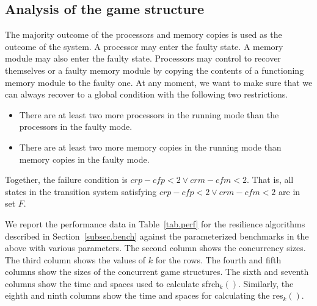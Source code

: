 \subsection*{Analysis of the game structure} 
The majority outcome of the processors and memory copies 
is used as the outcome of the system.  
A processor may enter the faulty state.  
A memory module may also enter the faulty state. 
Processors may control to recover themselves or a faulty memory module 
by copying the contents of a functioning memory module to 
the faulty one.  
At any moment, we want to make sure that we can always recover 
to a global condition with the following two restrictions. 
\begin{itemize} 
\item There are at least two more processors in \label{reply2.2more} 
	the running mode than the processors in the faulty mode.  
\item There are at least two more memory copies in 
	the running mode than memory copies in the faulty mode. 
\end{itemize} 
Together, the failure condition is 
$\textit{crp}-\textit{cfp}<2\vee\textit{crm}-\textit{cfm}<2$.  
That is, all states in the transition system satisfying 
$\textit{crp}-\textit{cfp}<2\vee\textit{crm}-\textit{cfm}<2$ 
are in set $F$.  

We report the performance data 
in Table~\ref{tab.perf} for the resilience algorithms 
described in Section~\ref{subsec.bench} 
against the parameterized benchmarks in the above with various 
parameters.  
The second column shows the concurrency sizes.  
The third column shows the values of $k$ for the rows.  
The fourth and fifth columns show the sizes of the concurrent game structures.  
The sixth and seventh columns show the time and spaces used to calculate 
sfrch$_k()$.  
Similarly, the eighth and ninth columns show the time and spaces for calculating 
the res$_k()$.  

